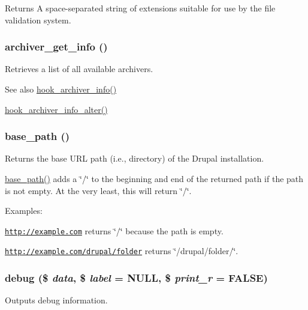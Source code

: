 \begin{DoxyReturn}{Returns}
A space-\/separated string of extensions suitable for use by the file validation system. 
\end{DoxyReturn}
\hypertarget{common_8inc_a15bb26df893f7c8919ab8e4505085028}{
\subsubsection[{archiver\_\-get\_\-info}]{\setlength{\rightskip}{0pt plus 5cm}archiver\_\-get\_\-info ()}}
\label{common_8inc_a15bb26df893f7c8919ab8e4505085028}
Retrieves a list of all available archivers.

\begin{DoxySeeAlso}{See also}
\hyperlink{group__hooks_ga1c5bd8d11e7d54242528f85434e5b260}{hook\_\-archiver\_\-info()} 

\hyperlink{group__hooks_ga4e6f6f94acbd7a21c4a4a2cc6916356d}{hook\_\-archiver\_\-info\_\-alter()} 
\end{DoxySeeAlso}
\hypertarget{common_8inc_ae227697e9c239f09fd7e36f71afde771}{
\subsubsection[{base\_\-path}]{\setlength{\rightskip}{0pt plus 5cm}base\_\-path ()}}
\label{common_8inc_ae227697e9c239f09fd7e36f71afde771}
Returns the base URL path (i.e., directory) of the Drupal installation.

\hyperlink{common_8inc_ae227697e9c239f09fd7e36f71afde771}{base\_\-path()} adds a \char`\"{}/\char`\"{} to the beginning and end of the returned path if the path is not empty. At the very least, this will return \char`\"{}/\char`\"{}.

Examples:
\begin{DoxyItemize}
\item \href{http://example.com}{\tt http://example.com} returns \char`\"{}/\char`\"{} because the path is empty.
\item \href{http://example.com/drupal/folder}{\tt http://example.com/drupal/folder} returns \char`\"{}/drupal/folder/\char`\"{}. 
\end{DoxyItemize}\hypertarget{common_8inc_a008ec6c4681fcb83701755c61daa8050}{
\subsubsection[{debug}]{\setlength{\rightskip}{0pt plus 5cm}debug (\$ {\em data}, \/  \$ {\em label} = {\ttfamily NULL}, \/  \$ {\em print\_\-r} = {\ttfamily FALSE})}}
\label{common_8inc_a008ec6c4681fcb83701755c61daa8050}
Outputs debug information.

